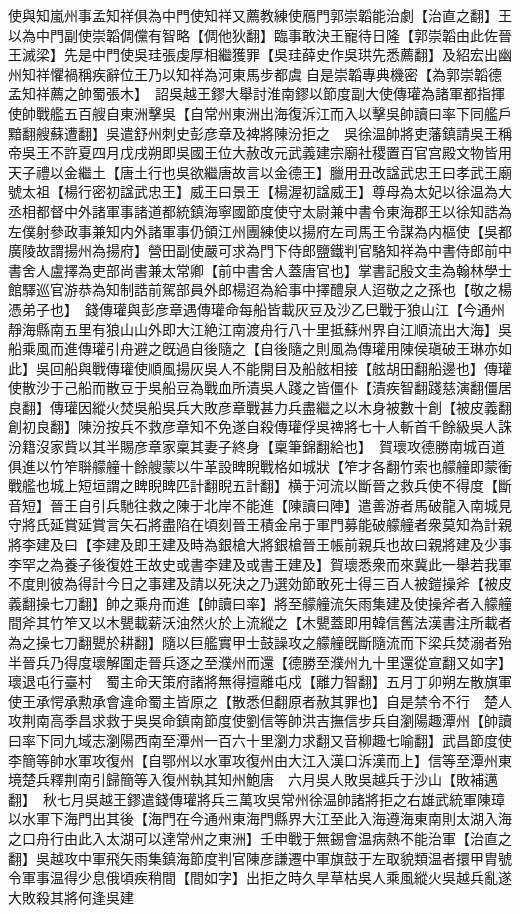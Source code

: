 使與知嵐州事孟知祥俱為中門使知祥又薦教練使鴈門郭崇韜能治劇【治直之翻】王以為中門副使崇韜倜儻有智略【倜他狄翻】臨事敢決王寵待日隆【郭崇韜由此佐晉王滅梁】先是中門使吳珪張虔厚相繼獲罪【吳珪薛史作吳珙先悉薦翻】及紹宏出幽州知祥懼禍稱疾辭位王乃以知祥為河東馬步都虞自是崇韜專典機密【為郭崇韜德孟知祥薦之帥蜀張木】　詔吳越王鏐大舉討淮南鏐以節度副大使傳瓘為諸軍都指揮使帥戰艦五百艘自東洲擊吳【自常州東洲出海復泝江而入以擊吳帥讀曰率下同艦戶黯翻艘蘇遭翻】吳遣舒州刺史彭彦章及裨將陳汾拒之　吳徐温帥將吏藩鎮請吳王稱帝吳王不許夏四月戊戌朔即吳國王位大赦改元武義建宗廟社稷置百官宫殿文物皆用天子禮以金繼土【唐土行也吳欲繼唐故言以金德王】臘用丑改諡武忠王曰孝武王廟號太祖【楊行密初諡武忠王】威王曰景王【楊渥初諡威王】尊母為太妃以徐温為大丞相都督中外諸軍事諸道都統鎮海寧國節度使守太尉兼中書令東海郡王以徐知誥為左僕射參政事兼知内外諸軍事仍領江州團練使以揚府左司馬王令謀為内樞使【吳都廣陵故謂揚州為揚府】營田副使嚴可求為門下侍郎鹽鐵判官駱知祥為中書侍郎前中書舍人盧擇為吏部尚書兼太常卿【前中書舍人蓋唐官也】掌書記殷文圭為翰林學士館驛巡官游恭為知制誥前駕部員外郎楊迢為給事中擇醴泉人迢敬之之孫也【敬之楊憑弟子也】　錢傳瓘與彭彦章遇傳瓘命每船皆載灰豆及沙乙巳戰于狼山江【今通州靜海縣南五里有狼山山外即大江絶江南渡舟行八十里抵蘇州界自江順流出大海】吳船乘風而進傳瓘引舟避之旣過自後隨之【自後隨之則風為傳瓘用陳侯瑱破王琳亦如此】吳回船與戰傳瓘使順風揚灰吳人不能開目及船舷相接【舷胡田翻船邊也】傳瓘使散沙于己船而散豆于吳船豆為戰血所漬吳人踐之皆僵仆【漬疾智翻踐慈演翻僵居良翻】傳瓘因縱火焚吳船吳兵大敗彦章戰甚力兵盡繼之以木身被數十創【被皮義翻創初良翻】陳汾按兵不救彦章知不免遂自殺傳瓘俘吳禆將七十人斬首千餘級吳人誅汾籍沒家貲以其半賜彦章家稟其妻子終身【稟筆錦翻給也】　賀瓌攻德勝南城百道俱進以竹笮聨艨艟十餘艘蒙以牛革設睥睨戰格如城狀【笮才各翻竹索也艨艟即蒙衝戰艦也城上短垣謂之睥睨睥匹計翻睨五計翻】横于河流以斷晉之救兵使不得度【斷音短】晉王自引兵馳往救之陳于北岸不能進【陳讀曰陣】遣善游者馬破龍入南城見守將氏延賞延賞言矢石將盡陷在頃刻晉王積金帛于軍門募能破艨艟者衆莫知為計親將李建及曰【李建及即王建及時為銀槍大將銀槍晉王帳前親兵也故曰親將建及少事李罕之為養子後復姓王故史或書李建及或書王建及】賀瓌悉衆而來冀此一舉若我軍不度則彼為得計今日之事建及請以死決之乃選効節敢死士得三百人被鎧操斧【被皮義翻操七刀翻】帥之乘舟而進【帥讀曰率】將至艨艟流矢雨集建及使操斧者入艨艟間斧其竹笮又以木甖載薪沃油然火於上流縱之【木甖蓋即用韓信舊法漢書注所載者為之操七刀翻甖於耕翻】隨以巨艦實甲士鼓譟攻之艨艟旣斷隨流而下梁兵焚溺者殆半晉兵乃得度瓌解圍走晉兵逐之至濮州而還【德勝至濮州九十里還從宣翻又如字】瓌退屯行臺村　蜀主命天策府諸將無得擅離屯戍【離力智翻】五月丁卯朔左散旗軍使王承愕承勲承會違命蜀主皆原之【散悉但翻原者赦其罪也】自是禁令不行　楚人攻荆南高季昌求救于吳吳命鎮南節度使劉信等帥洪吉撫信步兵自瀏陽趣潭州【帥讀曰率下同九域志瀏陽西南至潭州一百六十里瀏力求翻又音柳趣七喻翻】武昌節度使李簡等帥水軍攻復州【自鄂州以水軍攻復州由大江入漢口泝漢而上】信等至潭州東境楚兵釋荆南引歸簡等入復州執其知州鮑唐　六月吳人敗吳越兵于沙山【敗補邁翻】　秋七月吳越王鏐遣錢傳瓘將兵三萬攻吳常州徐温帥諸將拒之右雄武統軍陳璋以水軍下海門出其後【海門在今通州東海門縣界大江至此入海遵海東南則太湖入海之口舟行由此入太湖可以達常州之東洲】壬申戰于無錫會温病熱不能治軍【治直之翻】吳越攻中軍飛矢雨集鎮海節度判官陳彦謙遷中軍旗鼓于左取貌類温者擐甲胄號令軍事温得少息俄頃疾稍間【間如字】出拒之時久旱草枯吳人乘風縱火吳越兵亂遂大敗殺其將何逢吳建